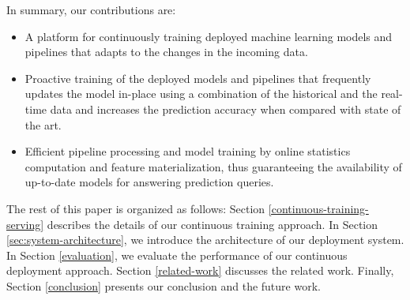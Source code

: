 In summary, our contributions are:
\begin{itemize}
\item A platform for continuously training deployed machine learning models and pipelines that adapts to the changes in the incoming data.
\item Proactive training of the deployed models and pipelines that frequently updates the model in-place using a combination of the historical and the real-time data and increases the prediction accuracy when compared with state of the art.
\item Efficient pipeline processing and model training by online statistics computation and feature materialization, thus guaranteeing the availability of up-to-date models for answering prediction queries.
\end{itemize}

The rest of this paper is organized as follows:
Section \ref{continuous-training-serving} describes the details of our continuous training approach.
In Section \ref{sec:system-architecture}, we introduce the architecture of our deployment system.
In Section \ref{evaluation}, we evaluate the performance of our continuous deployment approach.
Section \ref {related-work} discusses the related work.
Finally, Section \ref{conclusion} presents our conclusion and the future work.
